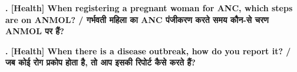 \documentclass[11pt,a4paper]{article}
\newcounter{qcounter}
\begin{document}
\textbf{. [Health] When registering a pregnant woman for ANC, which steps are on ANMOL? / गर्भवती महिला का ANC पंजीकरण करते समय कौन-से चरण ANMOL पर हैं?}
\vspace{0.1cm}
\vspace{0.2cm}
\hrulefill\par\vspace{0.6cm}\hrulefill\par\vspace{0.6cm}\hrulefill
\vspace{0.4cm}

\textbf{. [Health] When there is a disease outbreak, how do you report it? / जब कोई रोग प्रकोप होता है, तो आप इसकी रिपोर्ट कैसे करते हैं?}
\vspace{0.1cm}
\vspace{0.2cm}
\hrulefill\par\vspace{0.6cm}\hrulefill\par\vspace{0.6cm}\hrulefill
\vspace{0.4cm}
\end{document}
